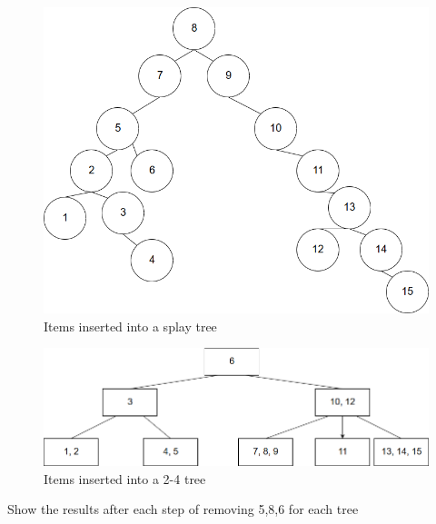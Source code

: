 \documentclass{article}
\begin{document}
\begin{enumerate}
	\begin{figure}[H]
 	  \centering
 	  \caption{Items inserted into a splay tree}
 	  \label{Trees:SplayTree}
	  \includegraphics[width=\textwidth]{SplayTree}
    \end{figure}
    
    \begin{figure}[H]
 	  \centering
 	  \caption{Items inserted into a 2-4 tree}
 	  \label{Trees:24Tree}
	  \includegraphics[width=\textwidth]{2-4}
    \end{figure}
    
    Show the results after each step of removing 5,8,6 for each tree
    

\end{enumerate}
\end{document}
